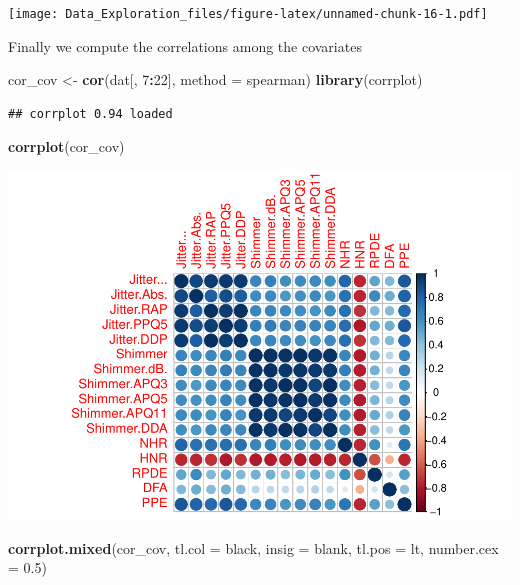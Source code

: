 \documentclass[
]{article}
\newenvironment{Shaded}{\begin{snugshade}}{\end{snugshade}}
\newcommand{\AttributeTok}[1]{\textcolor[rgb]{0.13,0.29,0.53}{#1}}
\newcommand{\DecValTok}[1]{\textcolor[rgb]{0.00,0.00,0.81}{#1}}
\newcommand{\FloatTok}[1]{\textcolor[rgb]{0.00,0.00,0.81}{#1}}
\newcommand{\FunctionTok}[1]{\textcolor[rgb]{0.13,0.29,0.53}{\textbf{#1}}}
\newcommand{\NormalTok}[1]{#1}
\newcommand{\OtherTok}[1]{\textcolor[rgb]{0.56,0.35,0.01}{#1}}
\newcommand{\SpecialCharTok}[1]{\textcolor[rgb]{0.81,0.36,0.00}{\textbf{#1}}}
\newcommand{\StringTok}[1]{\textcolor[rgb]{0.31,0.60,0.02}{#1}}
\begin{document}
\texttt{[image: Data\_Exploration\_files/figure-latex/unnamed-chunk-16-1.pdf]}

Finally we compute the correlations among the covariates

\begin{Shaded}
\begin{Highlighting}[]
\NormalTok{cor\_cov }\OtherTok{\textless{}{-}} \FunctionTok{cor}\NormalTok{(dat[, }\DecValTok{7}\SpecialCharTok{:}\DecValTok{22}\NormalTok{], }\AttributeTok{method =} \StringTok{\textquotesingle{}spearman\textquotesingle{}}\NormalTok{)}
\FunctionTok{library}\NormalTok{(corrplot)}
\end{Highlighting}
\end{Shaded}

\begin{verbatim}
## corrplot 0.94 loaded
\end{verbatim}

\begin{Shaded}
\begin{Highlighting}[]
\FunctionTok{corrplot}\NormalTok{(cor\_cov)}
\end{Highlighting}
\end{Shaded}

\includegraphics{Data_Exploration_files/figure-latex/unnamed-chunk-17-1.pdf}

\begin{Shaded}
\begin{Highlighting}[]
\FunctionTok{corrplot.mixed}\NormalTok{(cor\_cov, }\AttributeTok{tl.col =} \StringTok{\textquotesingle{}black\textquotesingle{}}\NormalTok{, }\AttributeTok{insig =} \StringTok{\textquotesingle{}blank\textquotesingle{}}\NormalTok{, }\AttributeTok{tl.pos =} \StringTok{\textquotesingle{}lt\textquotesingle{}}\NormalTok{, }\AttributeTok{number.cex =} \FloatTok{0.5}\NormalTok{)}
\end{Highlighting}
\end{Shaded}
\end{document}
